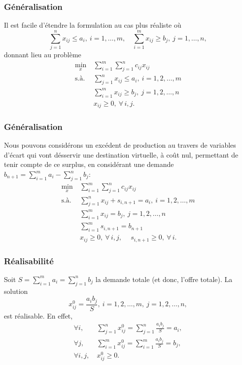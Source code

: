 \documentclass[usepdftitle=false, aspectratio=169]{beamer}
\begin{document}
\begin{frame}
\frametitle{Généralisation}

Il est facile d'étendre la formulation au cas plus réaliste où
$$
\sum_{j = 1}^n x_{ij} \leq a_i,\ i = 1,\ldots,m, \quad
\sum_{i = 1}^m x_{ij} \geq b_j,\ j = 1,\ldots,n,
$$
donnant lieu au problème
\begin{align*}
	\min_x \ & \sum_{i = 1}^m \sum_{j = 1}^n c_{ij} x_{ij} \\
	\mbox{s.à. } & \sum_{j = 1}^n x_{ij} \leq a_i, \ i = 1,2,\ldots,m \\
	& \sum_{i = 1}^m x_{ij} \geq b_j,\ j = 1,2,\ldots,n \\
	& x_{ij} \geq 0,\ \forall\, i, j.
\end{align*}

\end{frame}

\begin{frame}
\frametitle{Généralisation}

Nous pouvons considérons un excédent de production au travers de variables d'écart qui vont désservir une destination virtuelle, à coût nul, permettant de tenir compte de ce surplus, en considérant une demande $b_{n+1} = \sum_{i = 1}^m a_i - \sum_{j = 1}^n b_j$:
\begin{align*}
	\min_x \ & \sum_{i = 1}^m \sum_{j = 1}^n c_{ij} x_{ij} \\
	\mbox{s.à. } & \sum_{j = 1}^n x_{ij} + s_{i,n+1} = a_i, \ i = 1,2,\ldots,m \\
	& \sum_{i = 1}^m x_{ij} = b_j,\ j = 1,2,\ldots,n \\
	& \sum_{i = 1}^m s_{i,n+1} = b_{n+1} \\
	& x_{ij} \geq 0,\ \forall\, i, j,\ \quad s_{i,n+1} \geq 0,\ \forall\, i.
\end{align*}

\end{frame}

\begin{frame}
\frametitle{Réalisabilité}

Soit $S = \sum_{i = 1}^m a_i = \sum_{j = 1}^n b_j$ la demande totale (et donc, l'offre totale).
La solution
$$
x^0_{ij} = \frac{a_ib_j}{S},\ i=1,2,\ldots,m,\ j = 1,2,\ldots,n,
$$
est réalisable. En effet,
\begin{align*}
\forall i,\ & \sum_{j = 1}^n x^0_{ij} = \sum_{j = 1}^n \frac{a_ib_j}{S} = a_i, \\
\forall j,\ & \sum_{i = 1}^m x^0_{ij} = \sum_{i = 1}^m \frac{a_ib_j}{S} = b_j, \\
\forall i,j,\ & x^0_{ij} \geq 0.
\end{align*}

\end{frame}
\end{document}
